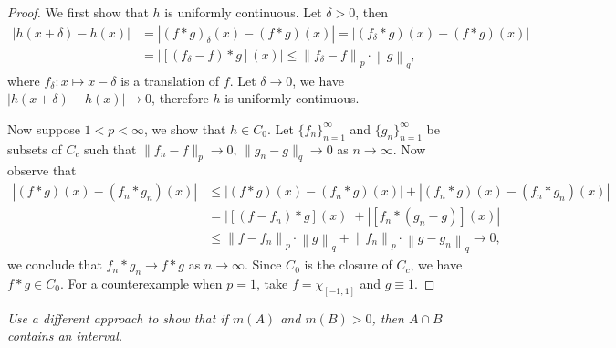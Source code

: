 \begin{proof}
We first show that $h$ is uniformly continuous. Let $\delta>0$, then 
$$
\begin{aligned}
\left| h\left( x+\delta \right) -h\left( x \right) \right|&=\left| \left( f*g \right) _{\delta}\left( x \right) -\left( f*g \right) \left( x \right) \right|=\left| \left( f_{\delta}*g \right) \left( x \right) -\left( f*g \right) \left( x \right) \right|
\\
&=\left| \left[ \left( f_{\delta}-f \right) *g \right] \left( x \right) \right|\le \left\| f_{\delta}-f \right\| _p\cdot \left\| g \right\| _q,
\end{aligned}
$$
where $f_\delta:x\mapsto x-\delta$ is a translation of $f$. Let $\delta\to 0$, we have $|h(x+\delta)-h(x)|\to 0$, therefore $h$ is uniformly continuous.\par
Now suppose $1<p<\infty$, we show that $h\in C_0$. Let $\{f_n\}_{n=1}^\infty$ and $\{g_n\}_{n=1}^\infty$ be subsets of $C_c$ such that $\|f_n-f\|_p\to 0$, $\|g_n-g\|_q\to 0$ as $n\to\infty$. Now observe that 
$$
\begin{aligned}
\left| \left( f*g \right) \left( x \right) -\left( f_n*g_n \right) \left( x \right) \right|&\le \left| \left( f*g \right) \left( x \right) -\left( f_n*g \right) \left( x \right) \right|+\left| \left( f_n*g \right) \left( x \right) -\left( f_n*g_n \right) \left( x \right) \right|
\\
&=\left| \left[ \left( f-f_n \right) *g \right] \left( x \right) \right|+\left| \left[ f_n*\left( g_n-g \right) \right] \left( x \right) \right|
\\
&\le \left\| f-f_n \right\| _p\cdot \left\| g \right\| _q+\left\| f_n \right\| _p\cdot \left\| g-g_n \right\| _q\rightarrow 0,
\end{aligned}
$$
we conclude that $f_n*g_n\to f*g$ as $n\to\infty$. Since $C_0$ is the closure of $C_c$, we have $f*g\in C_0$. For a counterexample when $p=1$, take $f=\chi_{[-1,1]}$ and $g\equiv 1$.
\end{proof}
\begin{problem}\em
Use a different approach to show that if $m(A)$ and $m(B)>0$, then $A\cap B$ contains an interval.
\end{problem}
